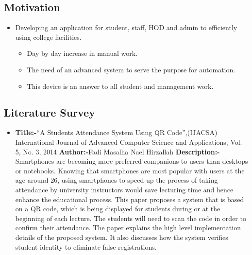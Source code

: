 \documentclass[10pt,a4paper]
{article}
\numberwithin{table}{section}
\begin{document}
{{\begin{normalsize}
\subsection{Motivation}
\begin{itemize}
\item Developing an application for student, staff, HOD and admin to efficiently using college facilities. 
\begin{itemize}
\item Day by day increase in manual work.
\item The need of an advanced system to serve the purpose for automation.
\item This device is an answer to all student and management work.
\end{itemize}
\end{itemize}

\subsection{Literature Survey}

\begin{itemize}
\item{\textbf{Title:-}{“A Students Attendance System Using QR Code”,(IJACSA) International Journal of Advanced Computer                 Science and Applications, Vol. 5, No. 3, 2014 }\newline
\textbf{Author:-}{Fadi Masalha 
Nael Hirzallah   
 } \newline
\textbf{Description:-}{Smartphones are becoming more preferred companions to users than desktops or notebooks. Knowing that smartphones are most popular with users at the age around 26, using smartphones to speed up the process of taking attendance by university instructors would save lecturing time and hence enhance the educational process. This paper proposes a system that is based on a QR code, which is being displayed for students during or at the beginning of each lecture. The students will need to scan the code in order to confirm their attendance. The paper explains the high level implementation details of the proposed system. It also discusses how the system verifies student identity to eliminate false registrations.}}


\end{itemize}
\end{normalsize}}}
\end{document}
